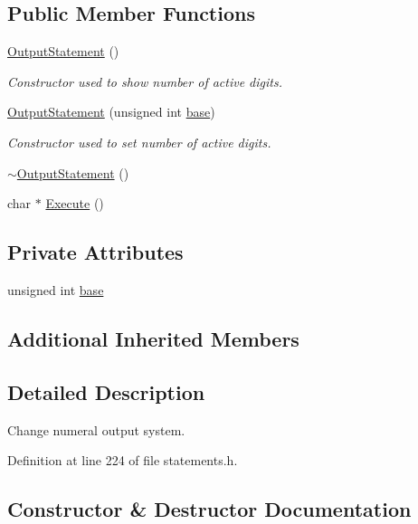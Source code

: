\subsection*{Public Member Functions}
\begin{DoxyCompactItemize}
\item 
\hyperlink{classOutputStatement_ad5e8759afc35877c8c26c24823f14243}{Output\+Statement} ()
\begin{DoxyCompactList}\small\item\em Constructor used to show number of active digits. \end{DoxyCompactList}\item 
\hyperlink{classOutputStatement_a69e4af18b24add7abe276ca1e681ac8b}{Output\+Statement} (unsigned int \hyperlink{classOutputStatement_ab0731e7d23a5d915e8b2ee12ceb1dbc5}{base})
\begin{DoxyCompactList}\small\item\em Constructor used to set number of active digits. \end{DoxyCompactList}\item 
\hyperlink{classOutputStatement_a1bb870374100755a3336152ce64e4dff}{$\sim$\+Output\+Statement} ()
\item 
char $\ast$ \hyperlink{classOutputStatement_a870c0d2b4bffb94e542d1e5890ec3c20}{Execute} ()
\end{DoxyCompactItemize}
\subsection*{Private Attributes}
\begin{DoxyCompactItemize}
\item 
unsigned int \hyperlink{classOutputStatement_ab0731e7d23a5d915e8b2ee12ceb1dbc5}{base}
\end{DoxyCompactItemize}
\subsection*{Additional Inherited Members}


\subsection{Detailed Description}
Change numeral output system. 

Definition at line 224 of file statements.\+h.



\subsection{Constructor \& Destructor Documentation}
